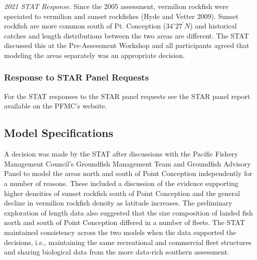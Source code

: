 \documentclass[11pt,
  english,
]{article}
\begin{document}
\emph{2021 STAT Response.} Since the 2005 assessment, vermilion rockfish were speciated to vermilion and sunset rockfishes {(Hyde and Vetter 2009)\leavevmode\tagmcend\tagstructend}. Sunset rockfish are more common south of Pt. Conception ($34^\circ 27^\prime N$) and historical catches and length distributions between the two areas are different. The STAT discussed this at the Pre-Assessment Workshop and all participants agreed that modeling the areas separately was an appropriate decision.


\hypertarget{response-to-star-panel-requests}{%
\subsubsection{Response to STAR Panel Requests}\label{response-to-star-panel-requests}}

\leavevmode\tagmcend\tagstructend

For the STAT responses to the STAR panel requests see the STAR panel report available on the PFMC's website.


\hypertarget{model-specifications}{%
\subsection{Model Specifications}\label{model-specifications}}

\leavevmode\tagmcend\tagstructend

A decision was made by the STAT after discussions with the Pacific Fishery Management Council's Groundfish Management Team and Groundfish Advisory Panel to model the areas north and south of Point Conception independently for a number of reasons. These included a discussion of the evidence supporting higher densities of sunset rockfish south of Point Conception and the general decline in vermilion rockfish density as latitude increases. The preliminary exploration of length data also suggested that the size composition of landed fish north and south of Point Conception differed in a number of fleets. The STAT maintained consistency across the two models when the data supported the decisions, i.e., maintaining the same recreational and commercial fleet structures and sharing biological data from the more data-rich southern assessment.
\end{document}
